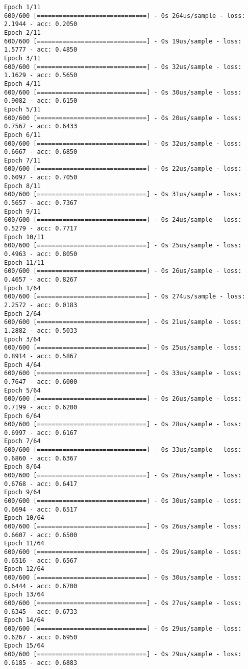 \documentclass[11pt]{article}
\begin{document}
    \begin{Verbatim}[commandchars=\\\{\}]
Epoch 1/11
600/600 [==============================] - 0s 264us/sample - loss: 2.1944 - acc: 0.2050
Epoch 2/11
600/600 [==============================] - 0s 19us/sample - loss: 1.5777 - acc: 0.4850
Epoch 3/11
600/600 [==============================] - 0s 32us/sample - loss: 1.1629 - acc: 0.5650
Epoch 4/11
600/600 [==============================] - 0s 30us/sample - loss: 0.9082 - acc: 0.6150
Epoch 5/11
600/600 [==============================] - 0s 20us/sample - loss: 0.7567 - acc: 0.6433
Epoch 6/11
600/600 [==============================] - 0s 32us/sample - loss: 0.6667 - acc: 0.6850
Epoch 7/11
600/600 [==============================] - 0s 22us/sample - loss: 0.6097 - acc: 0.7050
Epoch 8/11
600/600 [==============================] - 0s 31us/sample - loss: 0.5657 - acc: 0.7367
Epoch 9/11
600/600 [==============================] - 0s 24us/sample - loss: 0.5279 - acc: 0.7717
Epoch 10/11
600/600 [==============================] - 0s 25us/sample - loss: 0.4963 - acc: 0.8050
Epoch 11/11
600/600 [==============================] - 0s 26us/sample - loss: 0.4657 - acc: 0.8267
Epoch 1/64
600/600 [==============================] - 0s 274us/sample - loss: 2.2572 - acc: 0.0183
Epoch 2/64
600/600 [==============================] - 0s 21us/sample - loss: 1.2882 - acc: 0.5033
Epoch 3/64
600/600 [==============================] - 0s 25us/sample - loss: 0.8914 - acc: 0.5867
Epoch 4/64
600/600 [==============================] - 0s 33us/sample - loss: 0.7647 - acc: 0.6000
Epoch 5/64
600/600 [==============================] - 0s 26us/sample - loss: 0.7199 - acc: 0.6200
Epoch 6/64
600/600 [==============================] - 0s 28us/sample - loss: 0.6997 - acc: 0.6167
Epoch 7/64
600/600 [==============================] - 0s 33us/sample - loss: 0.6860 - acc: 0.6367
Epoch 8/64
600/600 [==============================] - 0s 26us/sample - loss: 0.6768 - acc: 0.6417
Epoch 9/64
600/600 [==============================] - 0s 30us/sample - loss: 0.6694 - acc: 0.6517
Epoch 10/64
600/600 [==============================] - 0s 26us/sample - loss: 0.6607 - acc: 0.6500
Epoch 11/64
600/600 [==============================] - 0s 29us/sample - loss: 0.6516 - acc: 0.6567
Epoch 12/64
600/600 [==============================] - 0s 30us/sample - loss: 0.6444 - acc: 0.6700
Epoch 13/64
600/600 [==============================] - 0s 27us/sample - loss: 0.6345 - acc: 0.6733
Epoch 14/64
600/600 [==============================] - 0s 29us/sample - loss: 0.6267 - acc: 0.6950
Epoch 15/64
600/600 [==============================] - 0s 29us/sample - loss: 0.6185 - acc: 0.6883

\end{Verbatim}
\end{document}
